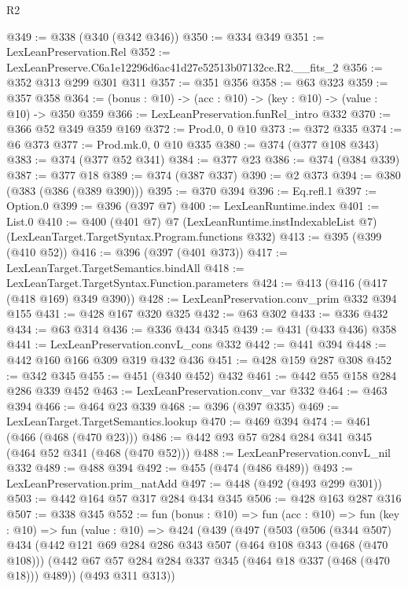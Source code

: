 \begin{lexlean}{R2}
\begin{coremodule}
@349 := @338 (@340 (@342 @346))
@350 := @334 @349
@351 := LexLeanPreservation.Rel
@352 := LexLeanPreserve.C6a1e12296d6ac41d27e52513b07132ce.R2.__fits_2
@356 := @352 @313 @299 @301 @311
@357 := @351 @356
@358 := @63 @323
@359 := @357 @358
@364 := (bonus : @10) -> (acc : @10) -> (key : @10) -> (value : @10) -> @350 @359
@366 := LexLeanPreservation.funRel_intro @332
@370 := @366 @52 @349 @359 @169
@372 := Prod.{0, 0} @10
@373 := @372 @335
@374 := @6 @373
@377 := Prod.mk.{0, 0} @10 @335
@380 := @374 (@377 @108 @343)
@383 := @374 (@377 @52 @341)
@384 := @377 @23
@386 := @374 (@384 @339)
@387 := @377 @18
@389 := @374 (@387 @337)
@390 := @2 @373
@394 := @380 (@383 (@386 (@389 @390)))
@395 := @370 @394
@396 := Eq.refl.{1}
@397 := Option.{0}
@399 := @396 (@397 @7)
@400 := LexLeanRuntime.index
@401 := List.{0}
@410 := @400
    (@401 @7)
    @7
    (LexLeanRuntime.instIndexableList @7)
    (LexLeanTarget.TargetSyntax.Program.functions @332)
@413 := @395 (@399 (@410 @52))
@416 := @396 (@397 (@401 @373))
@417 := LexLeanTarget.TargetSemantics.bindAll
@418 := LexLeanTarget.TargetSyntax.Function.parameters
@424 := @413 (@416 (@417 (@418 @169) @349 @390))
@428 := LexLeanPreservation.conv_prim @332 @394 @155
@431 := @428 @167 @320 @325
@432 := @63 @302
@433 := @336 @432
@434 := @63 @314
@436 := @336 @434 @345
@439 := @431 (@433 @436) @358
@441 := LexLeanPreservation.convL_cons @332
@442 := @441 @394
@448 := @442 @160 @166 @309 @319 @432 @436
@451 := @428 @159 @287 @308
@452 := @342 @345
@455 := @451 (@340 @452) @432
@461 := @442 @55 @158 @284 @286 @339 @452
@463 := LexLeanPreservation.conv_var @332
@464 := @463 @394
@466 := @464 @23 @339
@468 := @396 (@397 @335)
@469 := LexLeanTarget.TargetSemantics.lookup
@470 := @469 @394
@474 := @461 (@466 (@468 (@470 @23)))
@486 := @442 @93 @57 @284 @284 @341 @345 (@464 @52 @341 (@468 (@470 @52)))
@488 := LexLeanPreservation.convL_nil @332
@489 := @488 @394
@492 := @455 (@474 (@486 @489))
@493 := LexLeanPreservation.prim_natAdd
@497 := @448 (@492 (@493 @299 @301))
@503 := @442 @164 @57 @317 @284 @434 @345
@506 := @428 @163 @287 @316
@507 := @338 @345
@552 := fun (bonus : @10) =>
  fun (acc : @10) =>
  fun (key : @10) =>
  fun (value : @10) =>
  @424
    (@439
      (@497
        (@503
          (@506
            (@344 @507)
            @434
            (@442
              @121
              @69
              @284
              @286
              @343
              @507
              (@464 @108 @343 (@468 (@470 @108)))
              (@442 @67 @57 @284 @284 @337 @345 (@464 @18 @337 (@468 (@470 @18))) @489))
            (@493 @311 @313))

\end{coremodule}
\end{lexlean}
